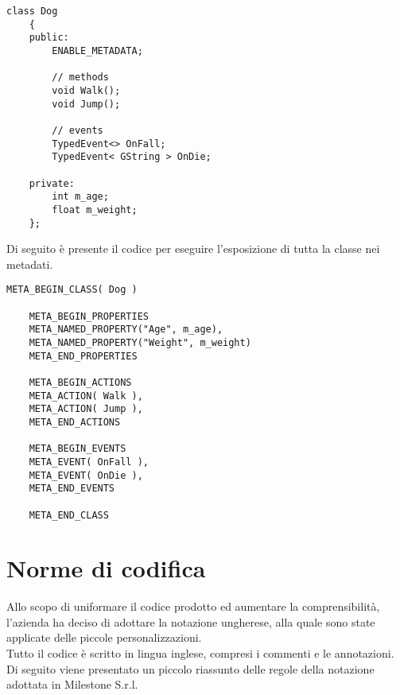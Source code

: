 \begin{lstlisting}[style=maurizio-code]
	class Dog
	{
	public:
		ENABLE_METADATA;

		// methods
		void Walk();
		void Jump();

		// events
		TypedEvent<> OnFall;
		TypedEvent< GString > OnDie;

	private:
		int m_age;
		float m_weight;
	};
\end{lstlisting}

Di seguito è presente il codice per eseguire l'esposizione di tutta la classe nei metadati.

\begin{lstlisting}[style=maurizio-code]
	META_BEGIN_CLASS( Dog )
	
	META_BEGIN_PROPERTIES
	META_NAMED_PROPERTY("Age", m_age),
	META_NAMED_PROPERTY("Weight", m_weight)
	META_END_PROPERTIES
	
	META_BEGIN_ACTIONS
	META_ACTION( Walk ),
	META_ACTION( Jump ),
	META_END_ACTIONS
	
	META_BEGIN_EVENTS
	META_EVENT( OnFall ),
	META_EVENT( OnDie ),
	META_END_EVENTS
	
	META_END_CLASS
\end{lstlisting}

\section{Norme di codifica}

Allo scopo di uniformare il codice prodotto ed aumentare la comprensibilità, l'azienda ha deciso di adottare la notazione ungherese, alla quale sono state applicate delle piccole personalizzazioni.\\

Tutto il codice è scritto in lingua inglese, compresi i commenti e le annotazioni. Di seguito viene presentato un piccolo riassunto delle regole della notazione adottata in Milestone S.r.l.\\

